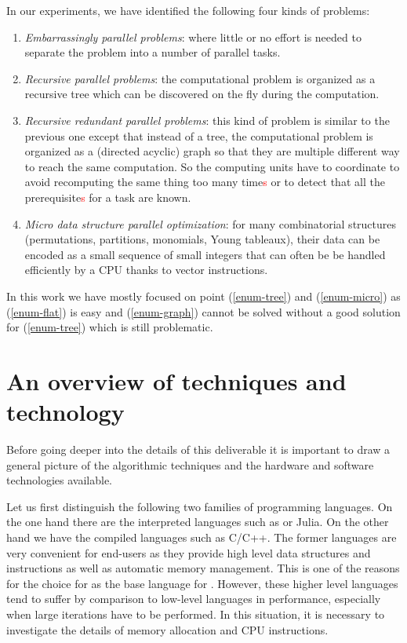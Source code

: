 \documentclass{deliverablereport}
\begin{document}
In our experiments, we have identified the following four kinds of problems:
\begin{enumerate}
\item\label{enum-flat} \emph{Embarrassingly parallel problems}: where
  little or no effort is needed to separate the problem into a number of
  parallel tasks.
\item\label{enum-tree} \emph{Recursive parallel problems}: the computational
  problem is organized as a recursive tree which can be discovered on the fly
  during the computation.
\item\label{enum-graph} \emph{Recursive redundant parallel problems}: this
  kind of problem is similar to the previous one except that instead of a
  tree, the computational problem is organized as a (directed acyclic) graph
  so that they are multiple different way to reach the same computation. So the
  computing units have to coordinate to avoid recomputing the same thing too
  many time\textcolor{red}{s} or to detect that all the prerequisite\textcolor{red}{s} for a task are known.
\item\label{enum-micro} \emph{Micro data structure parallel optimization}:
  for many combinatorial structures (permutations, partitions, monomials, Young
  tableaux), their data can be encoded as a small sequence of small integers
  that can often be be handled efficiently by a CPU thanks to vector instructions.
\end{enumerate}
In this work we have mostly focused on point (\ref{enum-tree}) and
(\ref{enum-micro}) as (\ref{enum-flat}) is easy and (\ref{enum-graph}) cannot
be solved without a good solution for (\ref{enum-tree}) which is still
problematic.


\section{An overview of techniques and technology}

Before going deeper into the details of this deliverable it is important to
draw a general picture of the algorithmic techniques and the hardware and
software technologies available.

Let us first distinguish the following two families of programming
languages. On the one hand there are the interpreted languages
such as \Python or Julia. On the other hand we have the compiled languages
such as C/C++. The former languages are very convenient for end-users as
they provide high level data structures and instructions as well as automatic
memory management. This is one of the reasons for the choice for \Python as the
base language for \Sage. However, these higher level languages tend to suffer
by comparison to low-level languages in performance, especially when large
iterations have to be performed. In this situation, it is necessary to
investigate the details of memory allocation and CPU instructions. 
\end{document}

